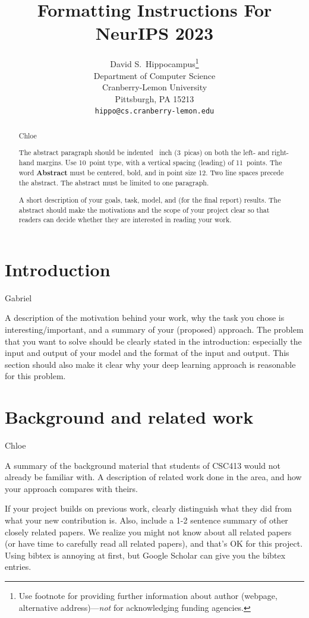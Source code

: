 \documentclass{article}
\title{Formatting Instructions For NeurIPS 2023}
\author{%
  David S.~Hippocampus\thanks{Use footnote for providing further information
    about author (webpage, alternative address)---\emph{not} for acknowledging
    funding agencies.} \\
  Department of Computer Science\\
  Cranberry-Lemon University\\
  Pittsburgh, PA 15213 \\
  \texttt{hippo@cs.cranberry-lemon.edu} \\
}
\begin{document}
\maketitle


\begin{abstract}
  Chloe

  The abstract paragraph should be indented ~inch (3~picas) on
  both the left- and right-hand margins. Use 10~point type, with a vertical
  spacing (leading) of 11~points.  The word \textbf{Abstract} must be centered,
  bold, and in point size 12. Two line spaces precede the abstract. The abstract
  must be limited to one paragraph.

  A short description of your goals, task, model, and (for
the final report) results. The abstract should make the
motivations and the scope of your project clear so that
readers can decide whether they are interested in
reading your work.
\end{abstract}


\section{Introduction}
Gabriel

A description of the motivation behind your work, why
the task you chose is interesting/important, and a
summary of your (proposed) approach. The problem
that you want to solve should be clearly stated in the
introduction: especially the input and output of your
model and the format of the input and output. This
section should also make it clear why your deep
learning approach is reasonable for this problem.

\section{Background and related work}
Chloe

A summary of the background material that students of
CSC413 would not already be familiar with. A
description of related work done in the area, and how
your approach compares with theirs.

If your project builds on previous work, clearly
distinguish what they did from what your new
contribution is. Also, include a 1-2 sentence summary
of other closely related papers. We realize you might
not know about all related papers (or have time to
carefully read all related papers), and that's OK for this
project. Using bibtex is annoying at first, but Google
Scholar can give you the bibtex entries.
\end{document}
